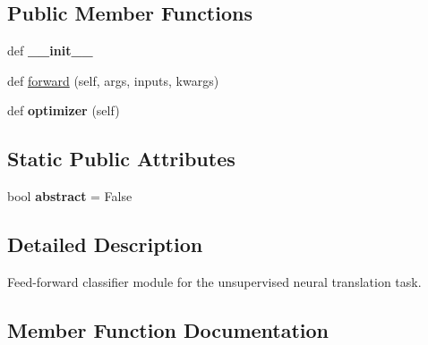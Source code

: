 \subsection*{Public Member Functions}
\begin{DoxyCompactItemize}
\item 
def {\bfseries \+\_\+\+\_\+init\+\_\+\+\_\+}\hypertarget{classutils_1_1FFClassifier_ad062320ee3630de6390d22b5d341ce4e}{}\label{classutils_1_1FFClassifier_ad062320ee3630de6390d22b5d341ce4e}

\item 
def \hyperlink{classutils_1_1FFClassifier_a13e7dc081218b4da11d413dcfe492ab7}{forward} (self, args, inputs, kwargs)
\item 
def {\bfseries optimizer} (self)\hypertarget{classutils_1_1FFClassifier_a372b0bea964edaf06d05b897a5d53b53}{}\label{classutils_1_1FFClassifier_a372b0bea964edaf06d05b897a5d53b53}

\end{DoxyCompactItemize}
\subsection*{Static Public Attributes}
\begin{DoxyCompactItemize}
\item 
bool {\bfseries abstract} = False\hypertarget{classutils_1_1FFClassifier_ac92dc5e5ff81ee98204a267e52b09091}{}\label{classutils_1_1FFClassifier_ac92dc5e5ff81ee98204a267e52b09091}

\end{DoxyCompactItemize}


\subsection{Detailed Description}
\begin{DoxyVerb}Feed-forward classifier module for the unsupervised neural translation task.
\end{DoxyVerb}
 

\subsection{Member Function Documentation}

